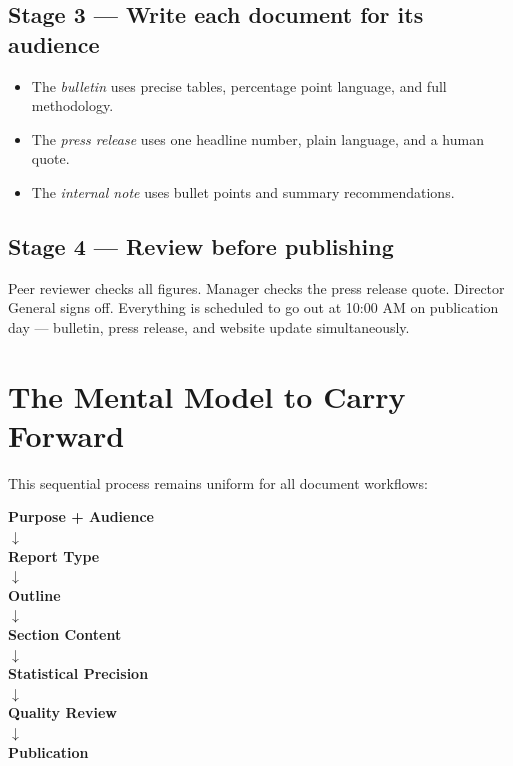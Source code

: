\documentclass[11pt,a4paper,oneside]{book}
\begin{document}
\subsection*{Stage 3 --- Write each document for its audience}
\begin{itemize}
    \item The \emph{bulletin} uses precise tables, percentage point language, and full methodology.
    \item The \emph{press release} uses one headline number, plain language, and a human quote.
    \item The \emph{internal note} uses bullet points and summary recommendations.
\end{itemize}

\subsection*{Stage 4 --- Review before publishing}
Peer reviewer checks all figures. Manager checks the press release quote. Director General signs off. Everything is scheduled to go out at 10:00 AM on publication day --- bulletin, press release, and website update simultaneously.

\section{The Mental Model to Carry Forward}

This sequential process remains uniform for all document workflows:

\begin{center}
\begin{tcolorbox}[nsoshadedbox, width=0.8\textwidth, halign=center]
\textbf{Purpose + Audience}\\
\(\downarrow\)\\
\textbf{Report Type}\\
\(\downarrow\)\\
\textbf{Outline}\\
\(\downarrow\)\\
\textbf{Section Content}\\
\(\downarrow\)\\
\textbf{Statistical Precision}\\
\(\downarrow\)\\
\textbf{Quality Review}\\
\(\downarrow\)\\
\textbf{Publication}
\end{tcolorbox}
\end{center}
\end{document}
